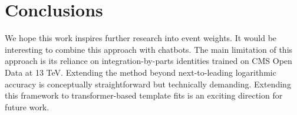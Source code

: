 \section{Conclusions}\label{sec:conclusions}

We hope this work inspires further research into event weights. It would
be interesting to combine this approach with chatbots. The main
limitation of this approach is its reliance on integration-by-parts
identities trained on CMS Open Data at 13 TeV. Extending the method
beyond next-to-leading logarithmic accuracy is conceptually
straightforward but technically demanding. Extending this framework to
transformer-based template fits is an exciting direction for future
work.

